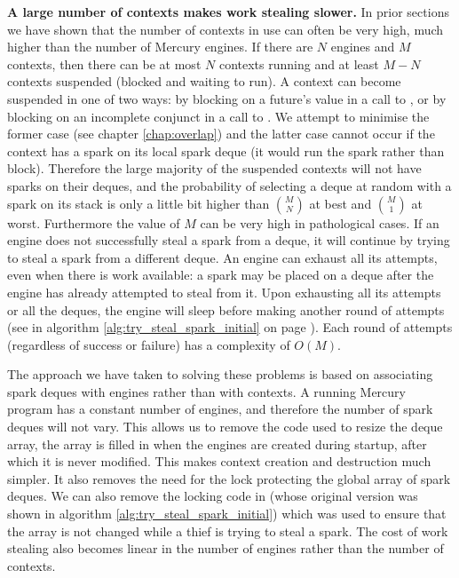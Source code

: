 \textbf{A large number of contexts makes work stealing slower.}
In prior sections
we have shown that the number of contexts in use can often be very high,
much higher than the number of Mercury engines.
If there are $N$ engines and $M$ contexts,
then there can be at most $N$ contexts running and
at least $M-N$ contexts suspended (blocked and waiting to run).
A context can become suspended in one of two ways:
by blocking on a future's value in a call to \wait,
or by blocking on an incomplete conjunct in a call to \joinandcontinue.
We attempt to minimise the former case (see chapter \ref{chap:overlap})
and the latter case cannot occur
if the context has a spark on its local spark deque (it would run the
spark rather than block).
Therefore the large majority of the suspended contexts will not have
sparks on their deques,
and the probability of selecting a deque at random with a spark on its
stack is only a little bit higher than $M \choose N$ at best and
$M \choose 1$ at worst.
Furthermore the value of $M$ can be very high in pathological cases.
If an engine does not successfully steal a spark from a deque,
it will continue by trying to steal a spark from a different deque.
An engine can exhaust all its attempts, even when there is work
available:
a spark may be placed on a deque after the engine has already attempted
to steal from it.
Upon exhausting all its attempts or all the deques,
the engine will sleep before making another round of attempts
(see \trystealspark in algorithm \ref{alg:try_steal_spark_initial} on
page \pageref{alg:try_steal_spark_initial}).
Each round of attempts (regardless of success or failure) has a
complexity of $O(M)$.

The approach we have taken to solving these problems is based on associating
spark deques with engines rather than with contexts.
A running Mercury program has a constant number of engines,
and therefore the number of spark deques will not vary.
This allows us to remove the code used to resize the deque array,
the array is filled in when the engines are created during startup,
after which it is never modified.
This makes context creation and destruction much simpler.
It also removes the need for the lock protecting the global array of spark
deques.
We can also remove the locking code in \trystealspark
(whose original version was shown in algorithm
\ref{alg:try_steal_spark_initial})
which was used to
ensure that the array is not changed while a thief is trying to steal a
spark.
The cost of work stealing also becomes linear in the number of engines
rather than the number of contexts.

